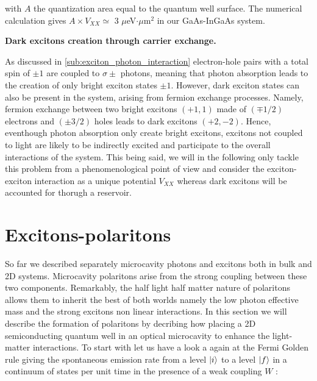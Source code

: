 with $A$ the quantization area equal to the  quantum well surface. The numerical calculation gives $A \times V_{XX}\simeq$ 3 $\mu$eV$\cdot \mu$m$^{2}$ in our GaAs-InGaAs system.

\bigskip

\textbf{Dark excitons creation through carrier exchange.}

As discussed in \autoref{sub:exciton_photon_interaction} electron-hole pairs with a total spin of $\pm1$ are coupled to $\sigma\pm$ photons, meaning that photon absorption leads to the creation of only bright exciton states $\pm1$. However, dark exciton states can also be present in the system, arising from fermion exchange processes.
Namely, fermion exchange between two bright excitons $(+1,1)$ made of $(\mp1/2)$ electrons and $(\pm3/2)$ holes leads to dark excitons $(+2,-2)$. Hence, eventhough photon absorption only create bright excitons, excitons not coupled to light are likely to be indirectly excited and participate to the overall interactions of the system.
This being said, we will in the following only tackle this problem from a phenomenological point of view and consider the exciton-exciton interaction as a unique potential $V_{XX}$ whereas dark excitons will be accounted for thorugh a reservoir.

  
\section{Excitons-polaritons}
So far we described separately microcavity photons and excitons both in bulk and 2D systems. Microcavity polaritons arise from the
strong coupling between these two components. Remarkably, the half light half matter nature of polaritons allows them to inherit the best of both worlds namely 
the low photon effective mass and the strong excitons non linear interactions. In this section we will describe the formation of polaritons 
by decribing how placing a 2D semiconducting quantum well in an optical microcavity to enhance the light-matter interactions. To start with let us 
have a look a again at the Fermi Golden rule giving the spontaneous emission rate from a level $\ket{i}$ to a level $\ket{f}$ in a continuum of states per unit time in the presence of a weak coupling $W$ :

